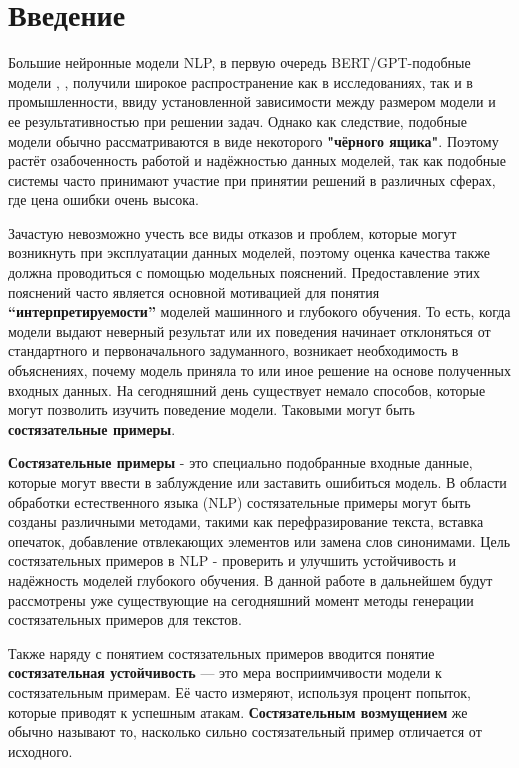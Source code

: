 \section{Введение}
\label{sec:Chapter0} 

\hspace{0.6cm}Большие нейронные модели NLP, в первую очередь BERT/GPT-подобные модели \cite{general1}, \cite{general2}, получили широкое распространение как в исследованиях, так и в промышленности, ввиду установленной зависимости между размером модели и ее результативностью при  решении задач. Однако как следствие, подобные модели обычно рассматриваются в виде некоторого \textbf{"чёрного ящика"}. Поэтому растёт озабоченность работой и надёжностью данных моделей, так как подобные системы часто принимают участие при принятии решений в различных сферах, где цена ошибки очень высока.

Зачастую невозможно учесть все виды отказов и проблем, которые могут возникнуть при эксплуатации данных моделей, поэтому оценка качества также должна проводиться с помощью модельных пояснений. Предоставление этих пояснений часто является основной мотивацией для понятия \textbf{“интерпретируемости”} моделей машинного и глубокого обучения. То есть, когда модели выдают неверный результат или их поведения начинает отклоняться от стандартного и первоначального задуманного, возникает необходимость в объяснениях, почему модель приняла то или иное решение на основе полученных входных данных. На сегодняшний день существует немало способов, которые могут позволить изучить поведение модели. Таковыми могут быть \textbf{состязательные примеры}.

\textbf{Состязательные примеры} - это специально подобранные входные данные, которые могут ввести в заблуждение или заставить ошибиться модель. В области обработки естественного языка (NLP) состязательные примеры могут быть созданы различными методами, такими как перефразирование текста, вставка опечаток, добавление отвлекающих элементов или замена слов синонимами. Цель состязательных примеров в NLP - проверить и улучшить устойчивость и надёжность моделей глубокого обучения. В данной работе в дальнейшем будут рассмотрены уже существующие на сегодняшний момент методы генерации состязательных примеров для текстов.

Также наряду с понятием состязательных примеров вводится понятие \textbf{состязательная устойчивость} — это мера восприимчивости модели к состязательным примерам. Её часто измеряют, используя процент попыток, которые приводят к успешным атакам. \textbf{Состязательным возмущением} же обычно называют то, насколько сильно состязательный пример отличается от исходного.

